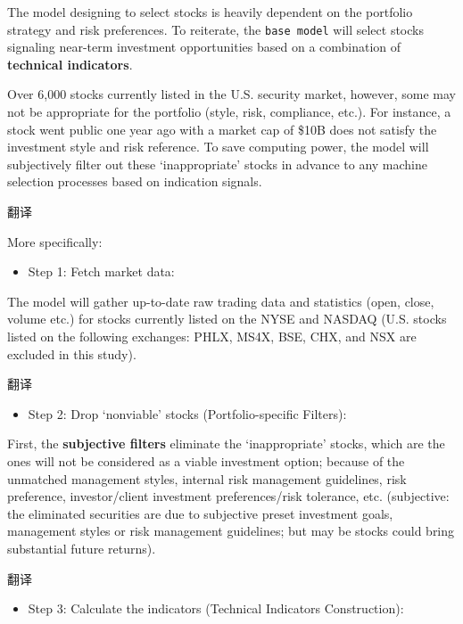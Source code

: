\documentclass[
]{book}
\providecommand{\tightlist}{%
  \setlength{\itemsep}{0pt}\setlength{\parskip}{0pt}}
\begin{document}
The model designing to select stocks is heavily dependent on the
portfolio strategy and risk preferences. To reiterate, the
\texttt{base\ model} will select stocks signaling near-term investment
opportunities based on a combination of \textbf{technical indicators}.

Over 6,000 stocks currently listed in the U.S. security market, however,
some may not be appropriate for the portfolio (style, risk, compliance,
etc.). For instance, a stock went public one year ago with a market cap
of \$10B does not satisfy the investment style and risk reference. To
save computing power, the model will subjectively filter out these
`inappropriate' stocks in advance to any machine selection processes
based on indication signals.

翻译

More specifically:

\begin{itemize}
\tightlist
\item
  Step 1: Fetch market data:
\end{itemize}

The model will gather up-to-date raw trading data and statistics (open,
close, volume etc.) for stocks currently listed on the NYSE and NASDAQ
(U.S. stocks listed on the following exchanges: PHLX, MS4X, BSE, CHX,
and NSX are excluded in this study).

翻译

\begin{itemize}
\tightlist
\item
  Step 2: Drop `nonviable' stocks (Portfolio-specific Filters):
\end{itemize}

First, the \textbf{subjective filters} eliminate the `inappropriate'
stocks, which are the ones will not be considered as a viable investment
option; because of the unmatched management styles, internal risk
management guidelines, risk preference, investor/client investment
preferences/risk tolerance, etc. (subjective: the eliminated securities
are due to subjective preset investment goals, management styles or risk
management guidelines; but may be stocks could bring substantial future
returns).

翻译

\begin{itemize}
\tightlist
\item
  Step 3: Calculate the indicators (Technical Indicators Construction):
\end{itemize}
\end{document}
